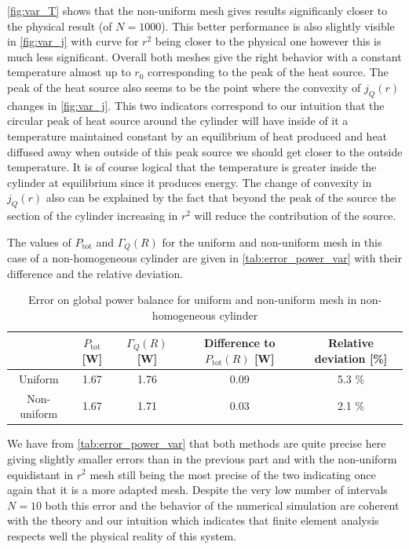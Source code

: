 \autoref{fig:var_T} shows that the non-uniform mesh gives results significanly closer to the physical result (of $N=1000$). This better performance is also slightly visible in \autoref{fig:var_j} with curve for $r^2$ being closer to the physical one however this is much less significant. Overall both meshes give the right behavior with a constant temperature almost up to $r_0$ corresponding to the peak of the heat source. The peak of the heat source also seems to be the point where the convexity of $j_Q(r)$ changes in \autoref{fig:var_j}. This two indicators correspond to our intuition that the circular peak of heat source around the cylinder will have inside of it a temperature maintained constant by an equilibrium of heat produced and heat diffused away when outside of this peak source we should get closer to the outside temperature. It is of course logical that the temperature is greater inside the cylinder at equilibrium since it produces energy. The change of convexity in $j_Q(r)$ also can be explained by the fact that beyond the peak of the source the section of the cylinder increasing in $r^2$ will reduce the contribution of the source.

The values of $P_\mathrm{tot}$ and $\Gamma_Q(R)$ for the uniform and non-uniform mesh in this case of a non-homogeneous cylinder are given in \autoref{tab:error_power_var} with their difference and the relative deviation.
\begin{table}[H]
    \centering
    \begin{tabulary}{\linewidth}{C|C C C C}
        \toprule
        & \(P_\textrm{tot}\) [\si{\watt}] & \(\Gamma_Q(R)\) [\si{\watt}] & Difference to \(P_\textrm{tot}(R)\) [\si{\watt}] & Relative deviation [\%] \\
        \midrule
        Uniform & 1.67 & 1.76 & 0.09 & 5.3 \% \\
        Non-uniform & 1.67 & 1.71 & 0.03 & 2.1 \% \\
        \bottomrule
    \end{tabulary}
    \caption{Error on global power balance for uniform and non-uniform mesh in non-homogeneous cylinder}
    \label{tab:error_power_var}
\end{table}

We have from \autoref{tab:error_power_var} that both methods are quite precise here giving slightly smaller errors than in the previous part and with the non-uniform equidistant in $r^2$ mesh still being the most precise of the two indicating once again that it is a more adapted mesh. Despite the very low number of intervals $N=10$ both this error and the behavior of the numerical simulation are coherent with the theory and our intuition which indicates that finite element analysis respects well the physical reality of this system.


